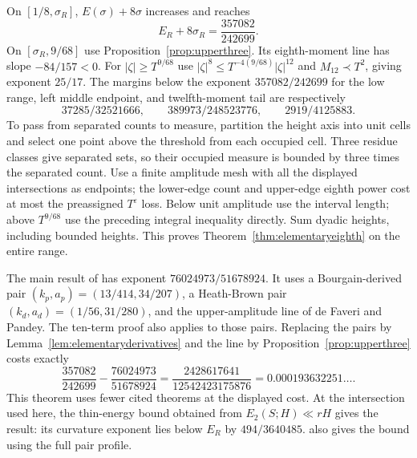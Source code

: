 On $[1/8,\sigma_R]$, $E(\sigma)+8\sigma$ increases and reaches
\[
 E_R+8\sigma_R=\frac{357082}{242699}.
\]
On $[\sigma_R,9/68]$ use Proposition~\ref{prop:upperthree}.
Its eighth-moment line has slope $-84/157<0$.
For $|\zeta|\ge T^{9/68}$ use
$|\zeta|^8\le T^{-4(9/68)}|\zeta|^{12}$ and $M_{12}\prec T^2$,
giving exponent $25/17$. The margins below the exponent
$357082/242699$ for the low range, left middle endpoint, and twelfth-moment tail are
respectively
\[
 37285/32521666,\qquad 389973/248523776,\qquad 2919/4125883.
\]
To pass from separated counts to measure, partition the height axis
into unit cells and select one point above the threshold from each
occupied cell. Three residue classes give separated sets, so their
occupied measure is bounded by three times the separated count.
Use a finite amplitude mesh with all the displayed intersections as
endpoints; the lower-edge count and upper-edge eighth power cost at
most the preassigned $T^\varepsilon$ loss. Below unit amplitude use
the interval length; above $T^{9/68}$ use the preceding integral
inequality directly. Sum dyadic heights, including bounded heights.
This proves Theorem~\ref{thm:elementaryeighth} on the entire range.

\begin{remark}
The main result of \cite{Thin} has exponent $76024973/51678924$. It uses
a Bourgain-derived pair $(k_p,a_p)=(13/414,34/207)$, a Heath-Brown pair
$(k_d,a_d)=(1/56,31/280)$, and the upper-amplitude line
\cite[(\ref*{p-eq:upper})]{Thin} of de Faveri and Pandey.
The ten-term proof also applies to those pairs. Replacing the pairs by
Lemma~\ref{lem:elementaryderivatives} and the line by
Proposition~\ref{prop:upperthree} costs exactly
\[
 \frac{357082}{242699}-\frac{76024973}{51678924}
 =\frac{2428617641}{12542423175876}=0.000193632251\ldots .
\]
This theorem uses fewer cited theorems at the displayed cost.
At the intersection used here, the thin-energy bound obtained from
$E_2(S;H)\ll rH$ gives the result: its
curvature exponent lies below $E_R$ by $494/3640485$.
\cite[Proposition~\ref*{p-prop:pairprofile}]{Thin} also gives the bound using the full pair profile.
\end{remark}


